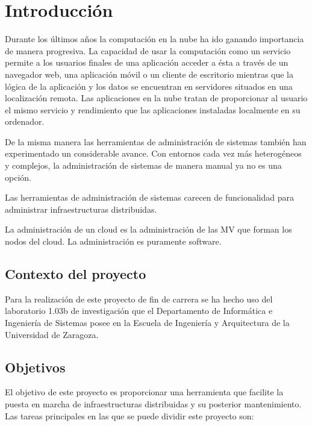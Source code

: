\chapter{Introducción}
\label{cap:introduccion}

{\sf

Durante los últimos años la computación en la nube ha ido ganando importancia de manera progresiva. La capacidad de usar la computación como un servicio permite a los usuarios finales de una aplicación acceder a ésta a través de un navegador web, una aplicación móvil o un cliente de escritorio mientras que la lógica de la aplicación y los datos se encuentran en servidores situados en una localización remota. Las aplicaciones en la nube tratan de proporcionar al usuario el mismo servicio y rendimiento que las aplicaciones instaladas localmente en su ordenador.

De la misma manera las herramientas de administración de sistemas también han experimentado un considerable avance. Con entornos cada vez más heterogéneos y complejos, la administración de sistemas de manera manual ya no es una opción.

Las herramientas de administración de sistemas carecen de funcionalidad para administrar infraestructuras distribuidas.

La administración de un cloud es la administración de las MV que forman los nodos del cloud. La administración es puramente software.

\section{Contexto del proyecto}

Para la realización de este proyecto de fin de carrera se ha hecho uso del laboratorio 1.03b de investigación que el Departamento de Informática e Ingeniería de Sistemas posee en la Escuela de Ingeniería y Arquitectura de la Universidad de Zaragoza.

\section{Objetivos}

El objetivo de este proyecto es proporcionar una herramienta que facilite la puesta en marcha de infraestructuras distribuidas y su posterior mantenimiento. Las tareas principales en las que se puede dividir este proyecto son:

}
